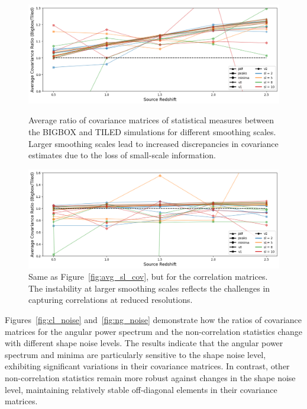 \begin{figure}[p]
    \centering
    \includegraphics[width=\textwidth]{figures/results/avg_cov_ratio_sl.png}
    \caption{Average ratio of covariance matrices of statistical measures between the BIGBOX and TILED simulations for different smoothing scales. Larger smoothing scales lead to increased discrepancies in covariance estimates due to the loss of small-scale information.}
    \label{fig:avg_sl_cov}
    \vspace{2cm}
    \includegraphics[width=\textwidth]{figures/results/avg_corr_ratio_sl.png}
    \caption{Same as Figure~\ref{fig:avg_sl_cov}, but for the correlation matrices. The instability at larger smoothing scales reflects the challenges in capturing correlations at reduced resolutions.}
    \label{fig:avg_sl_corr}
\end{figure}

Figures~\ref{fig:cl_noise} and~\ref{fig:ng_noise} demonstrate how the ratios of covariance matrices for the angular power spectrum and the non-correlation statistics change with different shape noise levels. The results indicate that the angular power spectrum and minima are particularly sensitive to the shape noise level, exhibiting significant variations in their covariance matrices. In contrast, other non-correlation statistics remain more robust against changes in the shape noise level, maintaining relatively stable off-diagonal elements in their covariance matrices.

